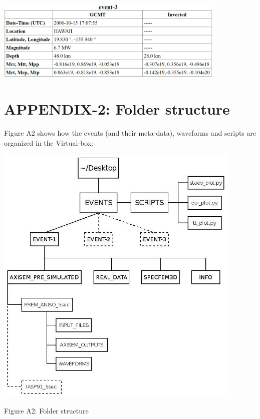 \documentclass{article}
\begin{document}
\begin{center}
\vspace{1cm}
\includegraphics[width=312pt, height=110pt, keepaspectratio=true]{AXISEMTutorial-fig004.png}

\end{center}



\newpage

\section{APPENDIX-2: Folder structure}

Figure A2 shows how the events (and their meta-data), waveforms and scripts are 
organized in the Virtual-box:

\begin{center}
\includegraphics[width=334pt, height=362pt, keepaspectratio=true]{AXISEMTutorial-fig005.jpg}

Figure A2: Folder structure
\end{center}
\end{document}
